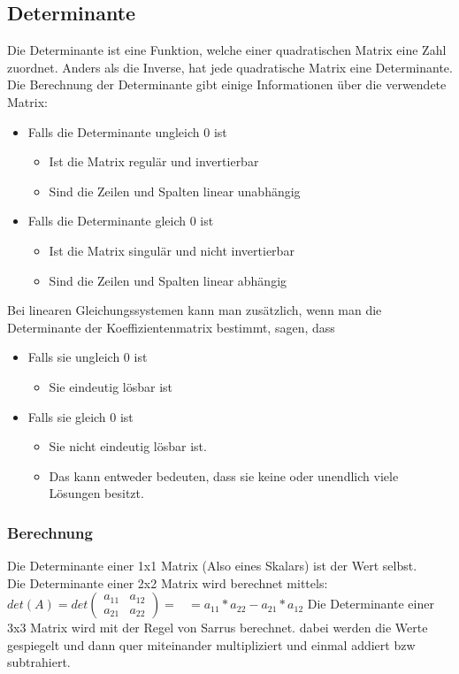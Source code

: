 \documentclass{article}
\begin{document}
	\subsection{Determinante}
	Die Determinante ist eine Funktion, welche einer quadratischen Matrix eine Zahl zuordnet. Anders als die Inverse, hat jede quadratische Matrix eine Determinante. \\
	Die Berechnung der Determinante gibt einige Informationen über die verwendete Matrix:
	\begin{itemize}
		\item{Falls die Determinante ungleich 0 ist}
		\begin{itemize}
			\item{Ist die Matrix regulär und invertierbar}
			\item{Sind die Zeilen und Spalten linear unabhängig}
		\end{itemize}
		\item{Falls die Determinante gleich 0 ist}
		\begin{itemize}
			\item{Ist die Matrix singulär und nicht invertierbar}
			\item{Sind die Zeilen und Spalten linear abhängig}
		\end{itemize}
	\end{itemize}
	Bei linearen Gleichungssystemen kann man zusätzlich, wenn man die Determinante der Koeffizientenmatrix bestimmt, sagen, dass
	\begin{itemize}
		\item{Falls sie ungleich 0 ist}
		\begin{itemize}
			\item{Sie eindeutig lösbar ist}
		\end{itemize}
		\item{Falls sie gleich 0 ist}
		\begin{itemize}
			\item{Sie nicht eindeutig lösbar ist.}
			\item{Das kann entweder bedeuten, dass sie keine oder unendlich viele Lösungen besitzt.}
		\end{itemize}
	\end{itemize}
	\subsubsection{Berechnung}
	Die Determinante einer 1x1 Matrix (Also eines Skalars) ist der Wert selbst. \\
	Die Determinante einer 2x2 Matrix wird berechnet mittels: $det(A)=det \begin{pmatrix} a_{11} & a_{12} \\ a_{21} & a_{22} \end{pmatrix}=\begin{matrix}  \\  \\  \end{matrix}=a_{11}*a_{22}-a_{21}*a_{12}$
	Die Determinante einer 3x3 Matrix wird mit der Regel von Sarrus berechnet. dabei werden die Werte gespiegelt und dann quer miteinander multipliziert und einmal addiert bzw subtrahiert.
\end{document}

